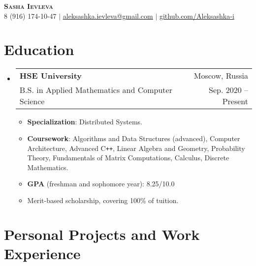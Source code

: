 \documentclass[letterpaper,11pt]{article}
\makeatletter
\newcommand{\resumeItem}[1]{
  \item\small{
    {#1 \vspace{-2pt}}
  }
}
\newcommand{\resumeSubheading}[4]{
   \vspace{-2pt}\item
    \begin{tabular*}{0.97\textwidth}[t]{l@{\extracolsep{\fill}}r}
      \textbf{\small#1} & \small#2 \\
      \textrm{\small#3} & \textrm{\small#4} \\
    \end{tabular*}\vspace{-7pt}
}
\newcommand{\resumeSubHeadingListStart}{\begin{itemize}[leftmargin=0.15in, label={}]}
\newcommand{\resumeSubHeadingListEnd}{\end{itemize}\vspace{-13pt}}
\newcommand{\resumeItemListStart}{\begin{itemize}[leftmargin=0.15in]}
\newcommand{\resumeItemListEnd}{\end{itemize}\vspace{-5pt}}
\makeatother
\begin{document}

\begin{center}
    \Huge \textbf{\scshape Sasha Ievleva} \\ \vspace{1pt}
    \small 8 (916) 174-10-47 $|$ \href{mailto:x@x.com}{\underline{aleksashka.ievleva@gmail.com}} $|$ 
    \faGithub\href{https://github.com/Aleksashka-i}{ github.com/Aleksashka-i}%
\end{center}


\section{Education}
  \resumeSubHeadingListStart
    \resumeSubheading
      {HSE University}{Moscow, Russia}
      {B.S. in Applied Mathematics and Computer Science}{Sep. 2020 -- Present}
      \resumeItemListStart
        \resumeItem{\textbf{Specialization}: Distributed Systems.}
        \resumeItem{\textbf{Coursework}: Algorithms and Data Structures (advanced), Computer Architecture, Advanced C\texttt{++}, Linear Algebra and Geometry, Probability Theory, Fundamentals of Matrix Computations, Calculus, Discrete Mathematics.}
        \resumeItem{\textbf{GPA} (freshman and sophomore year): 8.25/10.0}
        \resumeItem{Merit-based scholarship, covering 100\% of tuition.}
      \resumeItemListEnd
  \resumeSubHeadingListEnd


\section{Personal Projects and Work Experience}
\end{document}
